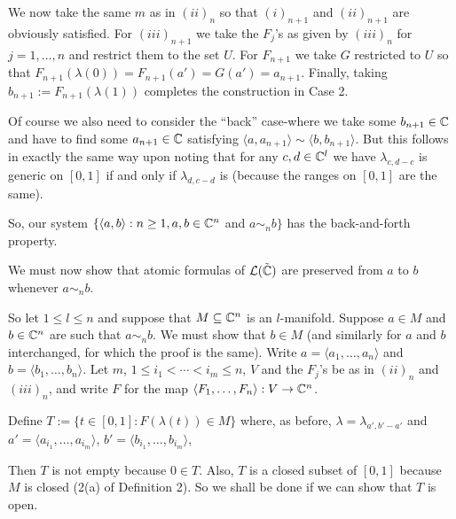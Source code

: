 \documentclass[12pt,nodate]{article}
\begin{document}
We now take the same $m$ as in $(ii)_{n}$ so that $(i)_{n+1}$ and $(ii)_{n+1}$ are obviously satisfied. For $(iii)_{n+1}$ we take the $F_j$'s as given by  $(iii)_{n}$ for $j = 1, \ldots , n$ and restrict them to the set $U$. For $F_{n+1}$ we take $G$ restricted to $U$ so that $F_{n+1} (\lambda (0)) =  F_{n+1} (a') = G(a') = a_{n+1}$. Finally, taking $b_{n+1} := F_{n+1} (\lambda (1))$ completes the construction in Case 2.
 
 \vspace{5mm}
 
 Of course we also need to consider the ``back'' case-where we take some $b_{n+1} \in \mathbb{C}$ and have to find some $a_{n+1} \in \mathbb{C}$ satisfying $\langle a, a_{n+1} \rangle \sim \langle b, b_{n+1} \rangle$. But this follows in exactly the same way upon noting that for any $c, d \in \mathbb{C}^l$ we have $\lambda_{c, d-c}$ is generic on $[0, 1]$ if and only if $\lambda_{d, c-d}$ is (because the ranges on $[0, 1]$ are the same).
 
 \vspace{2mm}
 
 So, our system $\{ \langle a, b \rangle : n \geq 1, a, b \in \mathbb{C}^{n}$ and $a \sim_n b \}$ has the back-and-forth property.
 
 We must now show that atomic formulas of $\mathcal{L}(\tilde{\mathbb{C}})$  are preserved from $a$ to $b$ whenever $a \sim_n b$.
 
 So let $1 \leq l \leq n$ and suppose that $M \subseteq \mathbb{C}^{n}$ is an $l$-manifold. Suppose $a \in M$ and $b \in \mathbb{C}^{n}$ are such that $a \sim_n b$. We must show that $b \in M$ (and similarly for $a$ and $b$ interchanged, for which the proof is the same). Write $a = \langle a_1 , \ldots , a_n \rangle$ and $b = \langle b_1 , \ldots , b_n \rangle$. Let $m$, $1 \leq i_1 < \cdots < i_m \leq n$, $V$ and the $F_j$'s be as in $(ii)_n$ and $(iii)_n$, and write $F$ for the map $\langle F_1 , \dots , F_n \rangle : V \rightarrow \mathbb{C}^{n}$.
 
 Define $T := \{ t \in [0, 1] : F( \lambda (t)) \in M \}$ where, as before, $\lambda = \lambda_{a', b'-a'}$ and $a' = \langle a_{i_1} , \ldots , a_{i_m} \rangle$, $b' = \langle b_{i_1} , \ldots , b_{i_m} \rangle$, 
 
 Then $T$ is not empty because $0 \in T$. Also, $T$ is a closed subset of $[0, 1]$ because $M$ is closed (2(a) of Definition 2). So we shall be done if we can show that $T$ is open.
 
 \vspace{2mm}
 
\end{document}
